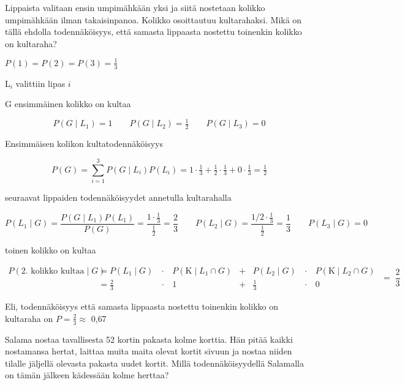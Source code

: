 \documentclass[12pt,a4paper]{article}
\begin{document}
Lippaista valitaan ensin umpimähkään yksi ja siitä nostetaan
kolikko umpimähkään ilman takaisinpanoa. Kolikko osoittautuu
kultarahaksi. Mikä on tällä ehdolla todennäköisyys, että samasta lippaasta
nostettu toinenkin kolikko on kultaraha?
\vspace{0.4cm}

$P(1)=P(2)=P(3)=\tfrac13$
\begin{kuvaus}
  \item[L\(_i\)] valittiin lipas \(i\)
  \item[G] ensimmäinen kolikko on kultaa
\end{kuvaus}




\[
P(G\mid L_1)=1\qquad
P(G\mid L_2)=\tfrac12\qquad
P(G\mid L_3)=0
\]
\begin{alakohta}
\item Ensimmäisen kolikon kultatodennäköisyys

\[
P(G)=\sum_{i=1}^{3}P(G\mid L_i)P(L_i)
     =1\cdot\tfrac13+\tfrac12\cdot\tfrac13+0\cdot\tfrac13
     =\tfrac12
\]

\item seuraavat lippaiden todennäköisyydet annetulla kultarahalla

\[
P(L_1\mid G)=\frac{P(G\mid L_1)P(L_1)}{P(G)}
            =\frac{1\cdot\tfrac13}{\tfrac12}=\frac23\qquad
P(L_2\mid G)=\frac{1/2\cdot\tfrac13}{\tfrac12}=\frac13\qquad
P(L_3\mid G)=0
\]

\item toinen kolikko on kultaa



\[
\begin{aligned}
P(\text{2.\ kolikko kultaa}\mid G)
 &= P(L_1\mid G)\,&\cdot&\,P(\text{K}\mid L_1\cap G) &+& P(L_2\mid G)\,&\cdot&\,P(\text{K}\mid L_2\cap G) \\[4pt]
 &= \frac23          &\cdot&\,1 &+& \frac13        &\cdot&\,0
\end{aligned}
\;=\;
\frac23
\]

\vspace{0.4cm}
Eli, todennäköisyys että samasta lippaasta nostettu toinenkin kolikko on kultaraha on
$P= \frac{2}{3}\approx$ 0{,}67

\end{alakohta}









\pagebreak
{}
Salama nostaa tavallisesta 52 kortin pakasta kolme korttia.
Hän pitää kaikki nostamansa hertat, laittaa muita maita olevat 
kortit sivuun ja nostaa niiden tilalle jäljellä olevasta pakasta 
uudet kortit. Millä todennäköisyydellä Salamalla on tämän jälkeen 
kädessään kolme herttaa?
\vspace{0.4cm}
\end{document}
